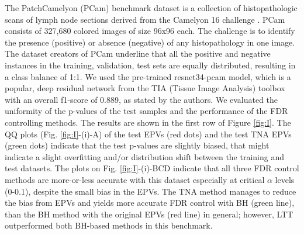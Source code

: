 \documentclass{article}
\begin{document}
The PatchCamelyon (PCam) benchmark dataset is a collection of histopathologic scans of lymph node sections \cite{Veeling2018-qh} derived from the Camelyon 16 challenge \cite{camelyon16}. PCam consists of 327,680 colored images of size 96x96 each. The challenge is to identify the presence (positive) or absence (negative) of any histopathology in one image. The dataset creators of PCam underline that all the positive and negative instances in the training, validation, test sets are equally distributed, resulting in a class balance of 1:1. We used the pre-trained resnet34-pcam model, which is a popular, deep residual network from the TIA (Tissue Image Analysis) toolbox \cite{Pocock2022} with an overall f1-score of 0.889, as stated by the authors. We evaluated the uniformity of the p-values of the test samples and the performance of the FDR controlling methods. The results are shown in the first row of Figure \ref{fig:I}.  The QQ plots (Fig. \ref{fig:I}-(i)-A) of the test EPVs (red dots) and the test TNA EPVs (green dots) indicate that the test p-values are slightly biased, that might indicate a slight overfitting and/or distribution shift between the training and test datasets. The plots on Fig. \ref{fig:I}-(i)-BCD indicate that all three FDR control methods are more-or-less accurate with this dataset especially at critical $\alpha$ levels (0-0.1), despite the small bias in the EPVs. The TNA method manages to reduce the bias from EPVs and yields more accurate FDR control with BH (green line), than the BH method with the original EPVs (red line) in general; however, LTT outperformed both BH-based methods in this benchmark. 
\end{document}
